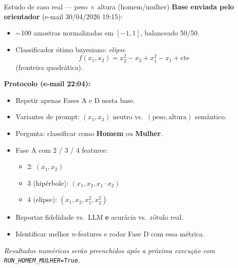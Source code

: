 \documentclass[aspectratio=169,10pt]{beamer}
\begin{document}
\begin{frame}{Estudo de caso real --- peso $\times$ altura (homem/mulher)}
  \footnotesize
  \textbf{Base enviada pelo orientador} (e-mail 30/04/2026 19:15):
  \begin{itemize}
    \item $\sim$100 amostras normalizadas em $[-1, 1]$, balanceado 50/50.
    \item Classificador \'otimo bayesiano: \emph{elipse}
    \[
      f(x_1, x_2) = x_2^2 - x_2 + x_1^2 - x_1 + \text{cte}
    \]
    (fronteira quadr\'atica).
  \end{itemize}
  \medskip

  \textbf{Protocolo (e-mail 22:04):}
  \begin{itemize}
    \item Repetir apenas Fases A e D nesta base.
    \item Variantes de prompt: $(x_1, x_2)$ neutro vs.\ $(\text{peso}, \text{altura})$ sem\^antico.
    \item Pergunta: classificar como \textbf{Homem} ou \textbf{Mulher}.
    \item Fase A com 2 / 3 / 4 features:
      \begin{itemize}
        \item 2: $(x_1, x_2)$
        \item 3 (hip\'erbole): $(x_1, x_2, x_1 \cdot x_2)$
        \item 4 (elipse): $(x_1, x_2, x_1^2, x_2^2)$
      \end{itemize}
    \item Reportar fidelidade vs.\ LLM \textbf{e} acur\'acia vs.\ r\'otulo real.
    \item Identificar melhor $n$-features e rodar Fase D com essa m\'etrica.
  \end{itemize}
  \medskip

  \textit{\small Resultados num\'ericos ser\~ao preenchidos ap\'os a pr\'oxima execu\c{c}\~ao com \texttt{RUN\_HOMEM\_MULHER=True}.}
\end{frame}
\end{document}
